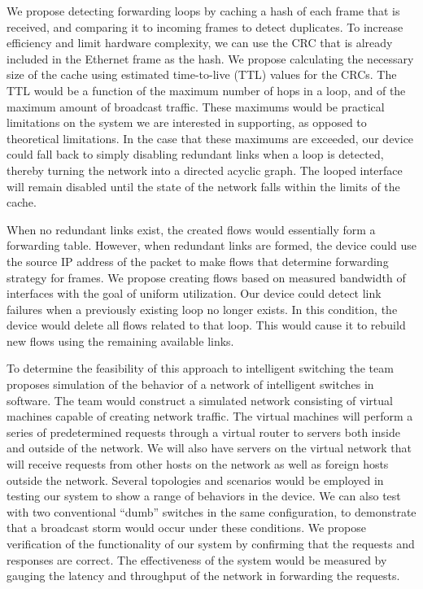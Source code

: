 	  We propose detecting forwarding loops by caching a hash of each frame that is received, and comparing it to incoming frames to detect duplicates.
	  To increase efficiency and limit hardware complexity, we can use the CRC that is already included in the Ethernet frame as the hash.
	  We propose calculating the necessary size of the cache using estimated time-to-live (TTL) values for the CRCs.
	  The TTL would be a function of the maximum number of hops in a loop, and of the maximum amount of broadcast traffic.
	  These maximums would be practical limitations on the system we are interested in supporting, as opposed to theoretical limitations.
	  In the case that these maximums are exceeded, our device could fall back to simply disabling redundant links when a loop is detected, thereby turning the network into a directed acyclic graph.
	  The looped interface will remain disabled until the state of the network falls within the limits of the cache.
	
	  When no redundant links exist, the created flows would essentially form a forwarding table.
	  However, when redundant links are formed, the device could use the source IP address of the packet to make flows that determine forwarding strategy for frames.
	  We propose creating flows based on measured bandwidth of interfaces with the goal of uniform utilization.
	  Our device could detect link failures when a previously existing loop no longer exists.
	  In this condition, the device would delete all flows related to that loop.
	  This would cause it to rebuild new flows using the remaining available links.

	  To determine the feasibility of this approach to intelligent switching the team proposes simulation of the behavior of a network of intelligent switches in software.
	  The team would construct a simulated network consisting of virtual machines capable of creating network traffic.
	  The virtual machines will perform a series of predetermined requests through a virtual router to servers both inside and outside of the network.
	  We will also have servers on the virtual network that will receive requests from other hosts on the network as well as foreign hosts outside the network.
	  Several topologies and scenarios would be employed in testing our system to show a range of behaviors in the device.
	  We can also test with two conventional ``dumb'' switches in the same configuration, to demonstrate that a broadcast storm would occur under these conditions.
	  We propose verification of the functionality of our system by confirming that the requests and responses are correct.
	  The effectiveness of the system would be measured by gauging the latency and throughput of the network in forwarding the requests.
